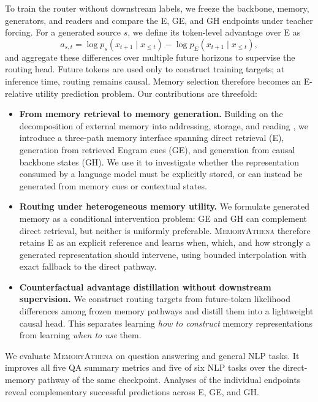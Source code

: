 \documentclass{article}
\begin{document}
To train the router without downstream labels, we freeze the backbone, memory,
generators, and readers and compare the E, GE, and GH endpoints under teacher
forcing. For a generated source $s$, we define its token-level advantage over E
as
\begin{equation}
    a_{s,t}
    =
    \log p_s(x_{t+1}\mid x_{\leq t})
    -
    \log p_E(x_{t+1}\mid x_{\leq t}),
\end{equation}
and aggregate these differences over multiple future horizons to supervise the
routing head. Future tokens are used only to construct training targets; at
inference time, routing remains causal. Memory selection therefore becomes an
E-relative utility prediction problem.
%
Our contributions are threefold:
\begin{itemize}
    \item \textbf{From memory retrieval to memory generation.}
    Building on the decomposition of external memory into addressing,
    storage, and reading \citep{li2026transfer}, we introduce a three-path memory
    interface spanning direct retrieval (E), generation from retrieved Engram
    cues (GE), and generation from causal backbone states (GH).
    We use it to investigate whether the representation consumed by a language
    model must be explicitly stored, or can instead be generated from memory
    cues or contextual states.

    \item \textbf{Routing under heterogeneous memory utility.}
    We formulate generated memory as a conditional intervention problem: GE and GH
    can complement direct retrieval, but neither is uniformly preferable.
    \textsc{MemoryAthena} therefore retains E as an explicit reference and learns
    when, which, and how strongly a generated representation should intervene,
    using bounded interpolation with exact fallback to the direct pathway.

    \item \textbf{Counterfactual advantage distillation without downstream
    supervision.}
    We construct routing targets from future-token likelihood differences among
    frozen memory pathways and distill them into a lightweight causal head.
    This separates learning \emph{how to construct} memory representations from
    learning \emph{when to use} them.
\end{itemize}

We evaluate \textsc{MemoryAthena} on question answering and general NLP tasks.
It improves all five QA summary metrics and five of six NLP tasks over the
direct-memory pathway of the same checkpoint.
Analyses of the individual endpoints reveal complementary successful
predictions across E, GE, and GH.
\end{document}
